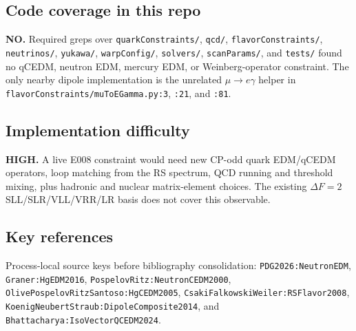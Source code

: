 \subsection*{Code coverage in this repo}
\textbf{NO.}  Required greps over \texttt{quarkConstraints/}, \texttt{qcd/},
\texttt{flavorConstraints/}, \texttt{neutrinos/}, \texttt{yukawa/},
\texttt{warpConfig/}, \texttt{solvers/}, \texttt{scanParams/}, and
\texttt{tests/} found no qCEDM, neutron EDM, mercury EDM, or Weinberg-operator
constraint.  The only nearby dipole implementation is the unrelated
\(\mu\to e\gamma\) helper in \texttt{flavorConstraints/muToEGamma.py:3},
\texttt{:21}, and \texttt{:81}.

\subsection*{Implementation difficulty}
\textbf{HIGH.}  A live E008 constraint would need new CP-odd quark EDM/qCEDM
operators, loop matching from the RS spectrum, QCD running and threshold
mixing, plus hadronic and nuclear matrix-element choices.  The existing
\(\Delta F=2\) SLL/SLR/VLL/VRR/LR basis does not cover this observable.

\subsection*{Key references}
Process-local source keys before bibliography consolidation:
\texttt{PDG2026:NeutronEDM}, \texttt{Graner:HgEDM2016},
\texttt{PospelovRitz:NeutronCEDM2000},
\texttt{OlivePospelovRitzSantoso:HgCEDM2005},
\texttt{CsakiFalkowskiWeiler:RSFlavor2008},
\texttt{KoenigNeubertStraub:DipoleComposite2014}, and
\texttt{Bhattacharya:IsoVectorQCEDM2024}.
